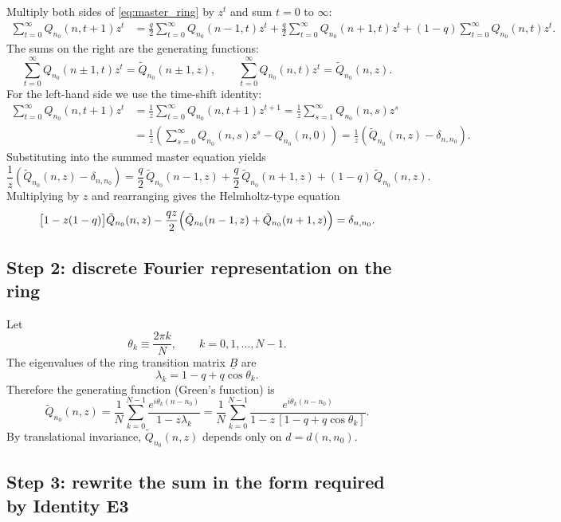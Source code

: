 \documentclass[11pt]{article}
\begin{document}
Multiply both sides of \eqref{eq:master_ring} by $z^t$ and sum $t=0$ to $\infty$:
\begin{align*}
\sum_{t=0}^{\infty} Q_{n_0}(n,t+1) z^t
&=\frac q2\sum_{t=0}^{\infty} Q_{n_0}(n-1,t) z^t
 +\frac q2\sum_{t=0}^{\infty} Q_{n_0}(n+1,t) z^t
 +(1-q)\sum_{t=0}^{\infty} Q_{n_0}(n,t) z^t.
\end{align*}
The sums on the right are the generating functions:
\[
\sum_{t=0}^{\infty} Q_{n_0}(n\pm 1,t) z^t=\tilde Q_{n_0}(n\pm 1,z),
\qquad
\sum_{t=0}^{\infty} Q_{n_0}(n,t) z^t=\tilde Q_{n_0}(n,z).
\]
For the left-hand side we use the time-shift identity:
\begin{align*}
\sum_{t=0}^{\infty} Q_{n_0}(n,t+1) z^t
&=\frac{1}{z}\sum_{t=0}^{\infty} Q_{n_0}(n,t+1) z^{t+1}
=\frac{1}{z}\sum_{s=1}^{\infty} Q_{n_0}(n,s) z^{s}\\
&=\frac{1}{z}\left(\sum_{s=0}^{\infty} Q_{n_0}(n,s) z^{s}-Q_{n_0}(n,0)\right)
=\frac{1}{z}\left(\tilde Q_{n_0}(n,z)-\delta_{n,n_0}\right).
\end{align*}
Substituting into the summed master equation yields
\[
\frac{1}{z}\left(\tilde Q_{n_0}(n,z)-\delta_{n,n_0}\right)
=
\frac q2\,\tilde Q_{n_0}(n-1,z)+\frac q2\,\tilde Q_{n_0}(n+1,z)
+(1-q)\,\tilde Q_{n_0}(n,z).
\]
Multiplying by $z$ and rearranging gives the Helmholtz-type equation
\begin{equation}
\bigl[1-z(1-q)\bigr]\tilde Q_{n_0}(n,z)-\frac{qz}{2}\Bigl(\tilde Q_{n_0}(n-1,z)+\tilde Q_{n_0}(n+1,z)\Bigr)
=\delta_{n,n_0}.
\label{eq:helmholtz_ring}
\end{equation}

\subsection{Step 2: discrete Fourier representation on the ring}

Let
\[
\theta_k\equiv \frac{2\pi k}{N},\qquad k=0,1,\dots,N-1.
\]
The eigenvalues of the ring transition matrix $\underline{B}$ are
\[
\lambda_k=1-q+q\cos\theta_k.
\]
Therefore the generating function (Green's function) is
\begin{equation}
\tilde Q_{n_0}(n,z)
=\frac{1}{N}\sum_{k=0}^{N-1}\frac{e^{i\theta_k(n-n_0)}}{1-z\lambda_k}
=
\frac{1}{N}\sum_{k=0}^{N-1}\frac{e^{i\theta_k(n-n_0)}}{1-z\,[1-q+q\cos\theta_k]}.
\label{eq:Q_fourier}
\end{equation}
By translational invariance, $\tilde Q_{n_0}(n,z)$ depends only on $d=d(n,n_0)$.

\subsection{Step 3: rewrite the sum in the form required by Identity E3}
\end{document}
